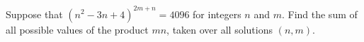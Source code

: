 Suppose that $(n^2-3n+4)^{2m+n}=4096$ for integers $n$ and $m$. Find the sum of all possible values of the product $mn$, taken over all solutions $(n,m)$.
